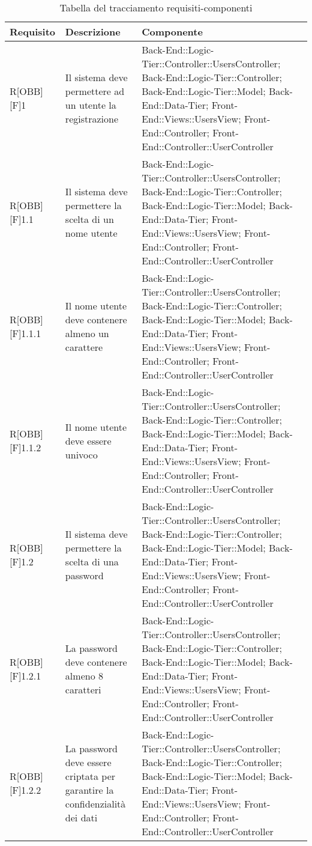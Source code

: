 	\begin{table}[h]
		\caption{Tabella del tracciamento requisiti-componenti}
		\begin{tabular}{|p{}|p{}|p{}|}
			\toprule
			
			\textbf{Requisito} & \textbf{Descrizione} & \textbf{Componente} \\
			
			\midrule

			R[OBB][F]1 & Il sistema deve permettere ad un utente la registrazione & Back-End::Logic-Tier::Controller::UsersController; Back-End::Logic-Tier::Controller; Back-End::Logic-Tier::Model; Back-End::Data-Tier; Front-End::Views::UsersView; Front-End::Controller; Front-End::Controller::UserController\\ \midrule
			R[OBB][F]1.1 & Il sistema deve permettere la scelta di un nome utente & Back-End::Logic-Tier::Controller::UsersController; Back-End::Logic-Tier::Controller; Back-End::Logic-Tier::Model; Back-End::Data-Tier; Front-End::Views::UsersView; Front-End::Controller; Front-End::Controller::UserController \\ \midrule
			R[OBB][F]1.1.1 & Il nome utente deve contenere almeno un carattere & Back-End::Logic-Tier::Controller::UsersController; Back-End::Logic-Tier::Controller; Back-End::Logic-Tier::Model; Back-End::Data-Tier; Front-End::Views::UsersView; Front-End::Controller; Front-End::Controller::UserController \\ \midrule
			R[OBB][F]1.1.2 & Il nome utente deve essere univoco & Back-End::Logic-Tier::Controller::UsersController; Back-End::Logic-Tier::Controller; Back-End::Logic-Tier::Model; Back-End::Data-Tier; Front-End::Views::UsersView; Front-End::Controller; Front-End::Controller::UserController \\ \midrule
			R[OBB][F]1.2 & Il sistema deve permettere la scelta di una password & Back-End::Logic-Tier::Controller::UsersController; Back-End::Logic-Tier::Controller; Back-End::Logic-Tier::Model; Back-End::Data-Tier; Front-End::Views::UsersView; Front-End::Controller; Front-End::Controller::UserController \\ \midrule
			R[OBB][F]1.2.1 & La password deve contenere almeno 8 caratteri & Back-End::Logic-Tier::Controller::UsersController; Back-End::Logic-Tier::Controller; Back-End::Logic-Tier::Model; Back-End::Data-Tier; Front-End::Views::UsersView; Front-End::Controller; Front-End::Controller::UserController \\ \midrule
			R[OBB][F]1.2.2 & La password deve essere criptata per garantire la confidenzialità dei dati & Back-End::Logic-Tier::Controller::UsersController; Back-End::Logic-Tier::Controller; Back-End::Logic-Tier::Model; Back-End::Data-Tier; Front-End::Views::UsersView; Front-End::Controller; Front-End::Controller::UserController \\ \midrule
			
	\end{tabular}
	\end{table}
	\newpage
	
